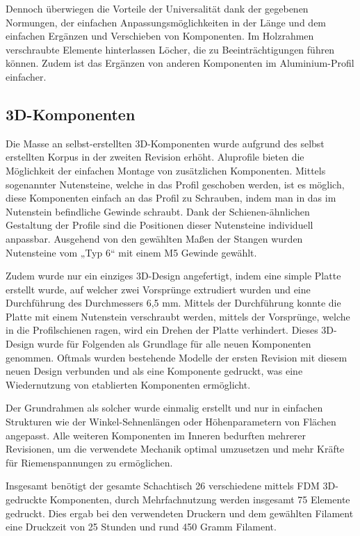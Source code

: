 Dennoch überwiegen die Vorteile der Universalität dank der gegebenen
Normungen, der einfachen Anpassungsmöglichkeiten in der Länge und dem
einfachen Ergänzen und Verschieben von Komponenten. Im Holzrahmen
verschraubte Elemente hinterlassen Löcher, die zu Beeinträchtigungen
führen können. Zudem ist das Ergänzen von anderen Komponenten im
Aluminium-Profil einfacher.

\hypertarget{d-komponenten}{%
\subsection{3D-Komponenten}\label{d-komponenten}}

Die Masse an selbst-erstellten 3D-Komponenten wurde aufgrund des selbst
erstellten Korpus in der zweiten Revision erhöht. Aluprofile bieten die
Möglichkeit der einfachen Montage von zusätzlichen Komponenten. Mittels
sogenannter Nutensteine, welche in das Profil geschoben werden, ist es
möglich, diese Komponenten einfach an das Profil zu Schrauben, indem man
in das im Nutenstein befindliche Gewinde schraubt. Dank der
Schienen-ähnlichen Gestaltung der Profile sind die Positionen dieser
Nutensteine individuell anpassbar. Ausgehend von den gewählten Maßen der
Stangen wurden Nutensteine vom „Typ 6`` mit einem M5 Gewinde gewählt.

Zudem wurde nur ein einziges 3D-Design angefertigt, indem eine simple
Platte erstellt wurde, auf welcher zwei Vorsprünge extrudiert wurden und
eine Durchführung des Durchmessers 6,5 mm. Mittels der Durchführung
konnte die Platte mit einem Nutenstein verschraubt werden, mittels der
Vorsprünge, welche in die Profilschienen ragen, wird ein Drehen der
Platte verhindert. Dieses 3D-Design wurde für Folgenden als Grundlage
für alle neuen Komponenten genommen. Oftmals wurden bestehende Modelle
der ersten Revision mit diesem neuen Design verbunden und als eine
Komponente gedruckt, was eine Wiedernutzung von etablierten Komponenten
ermöglicht.

Der Grundrahmen als solcher wurde einmalig erstellt und nur in einfachen
Strukturen wie der Winkel-Sehnenlängen oder Höhenparametern von Flächen
angepasst. Alle weiteren Komponenten im Inneren bedurften mehrerer
Revisionen, um die verwendete Mechanik optimal umzusetzen und mehr
Kräfte für Riemenspannungen zu ermöglichen.

Insgesamt benötigt der gesamte Schachtisch 26 verschiedene mittels FDM
3D-gedruckte Komponenten, durch Mehrfachnutzung werden insgesamt 75
Elemente gedruckt. Dies ergab bei den verwendeten Druckern und dem
gewählten Filament eine Druckzeit von 25 Stunden und rund 450 Gramm
Filament.

